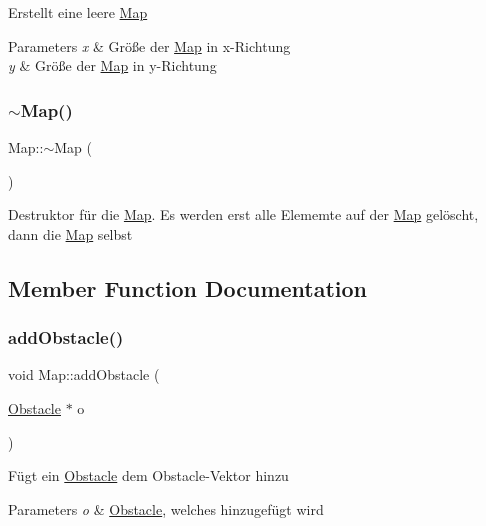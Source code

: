 Erstellt eine leere \mbox{\hyperlink{class_map}{Map}} 
\begin{DoxyParams}{Parameters}
{\em x} & Größe der \mbox{\hyperlink{class_map}{Map}} in x-\/\+Richtung \\
\hline
{\em y} & Größe der \mbox{\hyperlink{class_map}{Map}} in y-\/\+Richtung \\
\hline
\end{DoxyParams}
\mbox{\label{class_map_aa403fbe09394ccf39747588f5168e3b2}} 
\subsubsection{\texorpdfstring{$\sim$\+Map()}{~Map()}}
{\footnotesize\ttfamily Map\+::$\sim$\+Map (\begin{DoxyParamCaption}{ }\end{DoxyParamCaption})}

Destruktor für die \mbox{\hyperlink{class_map}{Map}}. Es werden erst alle Elememte auf der \mbox{\hyperlink{class_map}{Map}} gelöscht, dann die \mbox{\hyperlink{class_map}{Map}} selbst 

\subsection{Member Function Documentation}
\mbox{\label{class_map_adf099f25e89a3470a348ccf87bc4a55d}} 
\subsubsection{\texorpdfstring{add\+Obstacle()}{addObstacle()}}
{\footnotesize\ttfamily void Map\+::add\+Obstacle (\begin{DoxyParamCaption}\item[{\mbox{\hyperlink{class_obstacle}{Obstacle}} $\ast$}]{o }\end{DoxyParamCaption})}

Fügt ein \mbox{\hyperlink{class_obstacle}{Obstacle}} dem Obstacle-\/\+Vektor hinzu 
\begin{DoxyParams}{Parameters}
{\em o} & \mbox{\hyperlink{class_obstacle}{Obstacle}}, welches hinzugefügt wird \\
\hline
\end{DoxyParams}
\mbox{\label{class_map_a2727714e173313a9b2738b34deb78fb7}} 
